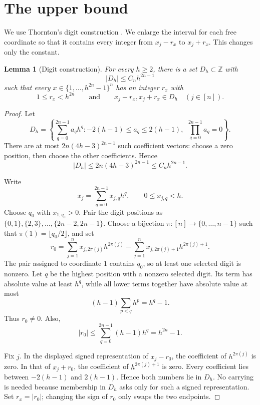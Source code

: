 \documentclass[11pt]{amsart}
\numberwithin{equation}{section}
\theoremstyle{plain}
\newtheorem{lemma}[theorem]{Lemma}
\theoremstyle{definition}
\newcommand{\Z}{\mathbb{Z}}
\begin{document}
\section{The upper bound}

We use Thornton's digit construction
\cite[Lemma~2.1 and Theorem~1.5]{Thornton2017}.  We enlarge the interval for
each free coordinate so that it contains every integer from $x_j-r_x$ to
$x_j+r_x$.  This changes only the constant.

\begin{lemma}[Digit construction]\label{lem:digits}
For every $h\geq2$, there is a set $D_h\subset\Z$ with
\[
 |D_h|\leq C_n h^{2n-1}
\]
such that every $x\in\{1,\ldots,h^{2n}-1\}^n$ has an integer $r_x$ with
\[
 1\leq r_x<h^{2n}
 \qquad\text{and}\qquad
 x_j-r_x,x_j+r_x\in D_h\quad(j\in[n]).
\]
\end{lemma}

\begin{proof}
Let
\[
 D_h=
 \left\{
 \sum_{q=0}^{2n-1}a_q h^q:
 -2(h-1)\leq a_q\leq2(h-1),\
 \ \prod_{q=0}^{2n-1}a_q=0
 \right\}.
\]
There are at most $2n(4h-3)^{2n-1}$ such coefficient vectors: choose a
zero position, then choose the other coefficients.  Hence
\[
 |D_h|\leq2n(4h-3)^{2n-1}\leq C_n h^{2n-1}.
\]

Write
\[
 x_j=\sum_{q=0}^{2n-1}x_{j,q}h^q,
 \qquad 0\leq x_{j,q}<h.
\]
Choose $q_0$ with $x_{1,q_0}>0$.  Pair the digit positions as
$\{0,1\},\{2,3\},\ldots,\{2n-2,2n-1\}$.  Choose a bijection
$\pi:[n]\to\{0,\ldots,n-1\}$ such that
$\pi(1)=\lfloor q_0/2\rfloor$, and set
\[
 r_0=
 \sum_{j=1}^n x_{j,2\pi(j)}h^{2\pi(j)}
 -\sum_{j=1}^n x_{j,2\pi(j)+1}h^{2\pi(j)+1}.
\]
The pair assigned to coordinate $1$ contains $q_0$, so at least one selected
digit is nonzero.  Let $q$ be the highest position with a nonzero selected
digit.  Its term has absolute value at least $h^q$, while
all lower terms together have absolute value at most
\[
 (h-1)\sum_{p<q}h^p=h^q-1.
\]
Thus $r_0\neq0$.  Also,
\[
 |r_0|\leq\sum_{q=0}^{2n-1}(h-1)h^q=h^{2n}-1.
\]

Fix $j$.  In the displayed signed representation of $x_j-r_0$, the
coefficient of $h^{2\pi(j)}$ is zero.  In that of $x_j+r_0$, the coefficient
of $h^{2\pi(j)+1}$ is zero.  Every coefficient lies between $-2(h-1)$ and
$2(h-1)$.  Hence both numbers lie in $D_h$.  No carrying is needed because
membership in $D_h$ asks only for such a signed representation.  Set
$r_x=|r_0|$; changing the sign of $r_0$ only swaps the two endpoints.
\end{proof}
\end{document}
